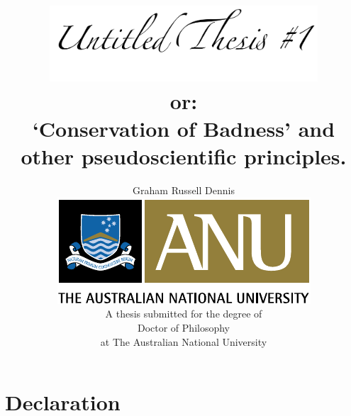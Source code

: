 \documentclass[twoside,onecolumn,11pt,a4paper,draft]{book}
\begin{document}

\begin{titlepage}
\graphicspath{{Figures/TitlePage/}{Figures/Common/}}
\title{\includegraphics[width=10cm]{UntitledTitle}\\
        or:\\
        `Conservation of Badness' and other pseudoscientific principles.}
 \author{Graham Russell Dennis\\[6cm]
 \includegraphics{ANU_PMS}\\[2cm]
  A thesis submitted for the degree of\\
  Doctor of Philosophy \\
  at The Australian National University\\[1cm]}
\maketitle
\end{titlepage}

\sloppy



\chapter*{Declaration}
\end{document}
